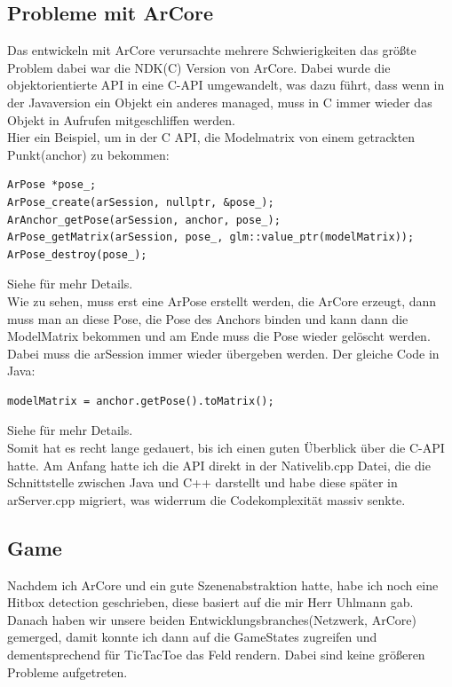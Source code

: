 \subsection{Probleme mit ArCore}
Das entwickeln mit ArCore verursachte mehrere Schwierigkeiten das größte Problem dabei war
die NDK(C) Version von ArCore. Dabei wurde die objektorientierte API in eine C-API
umgewandelt, was dazu führt, dass wenn in der Javaversion  ein Objekt ein anderes managed,
muss in C immer wieder das Objekt in Aufrufen mitgeschliffen werden.
\\
Hier ein Beispiel, um in der C API, die Modelmatrix von einem getrackten Punkt(anchor) zu bekommen:
\begin{verbatim}
ArPose *pose_;
ArPose_create(arSession, nullptr, &pose_);
ArAnchor_getPose(arSession, anchor, pose_);
ArPose_getMatrix(arSession, pose_, glm::value_ptr(modelMatrix));
ArPose_destroy(pose_);
\end{verbatim}
Siehe \cite{ar_anchor_c} für mehr Details.\\
Wie zu sehen, muss erst eine ArPose erstellt werden, die ArCore erzeugt, dann muss man an diese Pose, die Pose des Anchors binden und kann dann die ModelMatrix bekommen und am Ende muss die Pose wieder gelöscht werden. Dabei muss die arSession immer wieder übergeben werden.
Der gleiche Code in Java:
\begin{verbatim}
modelMatrix = anchor.getPose().toMatrix();
\end{verbatim}
Siehe \cite{ar_anchor_java} für mehr Details.\\
Somit hat es recht lange gedauert, bis ich einen guten Überblick über die C-API
hatte. Am Anfang hatte ich die API direkt in der Nativelib.cpp Datei, die die
Schnittstelle zwischen Java und C++ darstellt und habe diese später in arServer.cpp
migriert, was widerrum die Codekomplexität massiv senkte.

\subsection{Game}
Nachdem ich ArCore und ein gute Szenenabstraktion hatte, habe ich noch eine Hitbox detection geschrieben, diese basiert auf \cite{hitbox_detection}
die mir Herr Uhlmann gab.\\

Danach haben wir unsere beiden Entwicklungsbranches(Netzwerk, ArCore) gemerged, damit konnte ich
dann auf die GameStates zugreifen und dementsprechend für TicTacToe das Feld rendern.
Dabei sind keine größeren Probleme aufgetreten. \\

